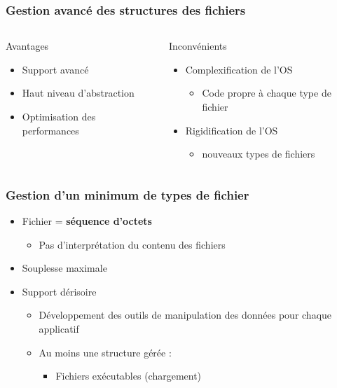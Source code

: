 \begin{frame}
\frametitle{Gestion avancé des structures des fichiers}
\begin{columns}
\begin{block}{Avantages}
\begin{itemize}
\item Support avancé
\item Haut niveau d'abstraction
\item Optimisation des performances
\end{itemize}
\end{block}
\begin{block}{Inconvénients}
\begin{itemize}
\item Complexification de l'OS
\begin{itemize}
\item Code propre à chaque type de fichier
\end{itemize}
\item Rigidification de l'OS
\begin{itemize}
\item nouveaux types de fichiers 
\end{itemize}
\end{itemize}
\end{block}
\end{columns}
\end{frame}

\begin{frame}
\frametitle{Gestion d'un minimum de types de fichier}
\begin{itemize}
\item Fichier = \textbf{séquence d'octets}
\begin{itemize}
\item Pas d'interprétation du contenu des fichiers
\end{itemize}
\item Souplesse maximale
\item Support dérisoire
\begin{itemize}
\item Développement des outils de manipulation des données pour chaque applicatif
\item Au moins une structure gérée :
\begin{itemize}
\item Fichiers exécutables (chargement)
\end{itemize}
\end{itemize}
\end{itemize}
\end{frame}

